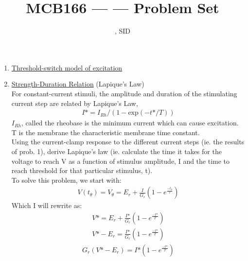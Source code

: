 \documentclass[11pt]{article}
\title{MCB166 --- \Session --- Problem Set \Homework}
\author{\Name, SID \SID}
\date{}
\begin{document}
\maketitle

\newpage
\begin{enumerate}[label=\arabic*.]
\item
\underline{Threshold-switch model of excitation}
\vspace*{1\baselineskip}
\\










\newpage
\item
\underline{Strength-Duration Relation} (Lapique's Law)
\vspace*{1\baselineskip}
\\
For constant-current stimuli, the amplitude and duration of the stimulating current step are related by Lapique's Law,
\begin{align*}
I\text{*} = I_{Rh} / (1 - \text{exp}(-t\text{*} / T))
\end{align*}
$I_{Rh}$, called the rheobase is the minimum current which can cause excitation. T is the membrane the characteristic membrane time constant.
\vspace*{1\baselineskip}
\\
Using the current-clamp response to the different current steps (ie. the results of prob. 1), derive Lapique's law (ie. calculate the time it takes for the voltage to reach V\text{*} as a function of stimulus amplitude, I\text{*} and the time to reach threshold for that particular stimulus, t\text{*}).
\vspace*{1\baselineskip}
\\
To solve this problem, we start with:
\begin{align*}
V(t_\theta) = V_\theta = E_r + \frac{I} {G_r} \left(1 - e ^ {\frac{-t_\theta} {\tau}}\right)
\end{align*}
Which I will rewrite as:
\begin{align*}
V\text{*} = E_r + \frac{I\text{*}} {G_r} \left(1 - e ^ {\frac{-t\text{*}} {T}}\right)
\end{align*}
\begin{align*}
V\text{*} - E_r = \frac{I\text{*}} {G_r} \left(1 - e ^ {\frac{-t\text{*}} {T}}\right)
\end{align*}
\begin{align*}
G_r \left(V\text{*} - E_r\right) = I\text{*} \left(1 - e ^ {\frac{-t\text{*}} {T}}\right)

\end{align*}
\end{enumerate}
\end{document}
